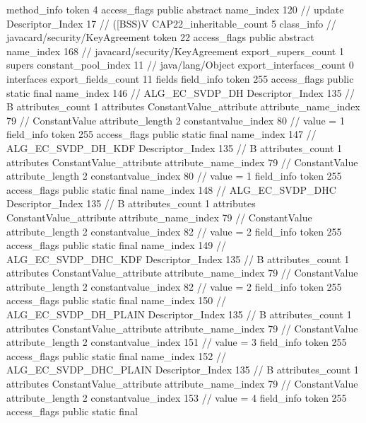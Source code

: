 {{{{{				}
				method_info {
					token	4
					access_flags	public abstract
					name_index	120		// update
					Descriptor_Index	17		// ([BSS)V
				}
			}
			CAP22_inheritable_count	5
		}
		class_info {		// javacard/security/KeyAgreement
			token	22
			access_flags	public abstract
			name_index	168		// javacard/security/KeyAgreement
			export_supers_count	1
			supers {
				constant_pool_index	11		// java/lang/Object
			}
			export_interfaces_count	0
			interfaces {
			}
			export_fields_count	11
			fields {
			field_info {
				token	255
				access_flags	public static final
				name_index	146		// ALG_EC_SVDP_DH
				Descriptor_Index	135		// B
				attributes_count	1
				attributes {
				ConstantValue_attribute {
					attribute_name_index	79		// ConstantValue
					attribute_length	2
					constantvalue_index	80		// value = 1
				}
				}
			}
			field_info {
				token	255
				access_flags	public static final
				name_index	147		// ALG_EC_SVDP_DH_KDF
				Descriptor_Index	135		// B
				attributes_count	1
				attributes {
				ConstantValue_attribute {
					attribute_name_index	79		// ConstantValue
					attribute_length	2
					constantvalue_index	80		// value = 1
				}
				}
			}
			field_info {
				token	255
				access_flags	public static final
				name_index	148		// ALG_EC_SVDP_DHC
				Descriptor_Index	135		// B
				attributes_count	1
				attributes {
				ConstantValue_attribute {
					attribute_name_index	79		// ConstantValue
					attribute_length	2
					constantvalue_index	82		// value = 2
				}
				}
			}
			field_info {
				token	255
				access_flags	public static final
				name_index	149		// ALG_EC_SVDP_DHC_KDF
				Descriptor_Index	135		// B
				attributes_count	1
				attributes {
				ConstantValue_attribute {
					attribute_name_index	79		// ConstantValue
					attribute_length	2
					constantvalue_index	82		// value = 2
				}
				}
			}
			field_info {
				token	255
				access_flags	public static final
				name_index	150		// ALG_EC_SVDP_DH_PLAIN
				Descriptor_Index	135		// B
				attributes_count	1
				attributes {
				ConstantValue_attribute {
					attribute_name_index	79		// ConstantValue
					attribute_length	2
					constantvalue_index	151		// value = 3
				}
				}
			}
			field_info {
				token	255
				access_flags	public static final
				name_index	152		// ALG_EC_SVDP_DHC_PLAIN
				Descriptor_Index	135		// B
				attributes_count	1
				attributes {
				ConstantValue_attribute {
					attribute_name_index	79		// ConstantValue
					attribute_length	2
					constantvalue_index	153		// value = 4
				}
				}
			}
			field_info {
				token	255
				access_flags	public static final
}}}}}
